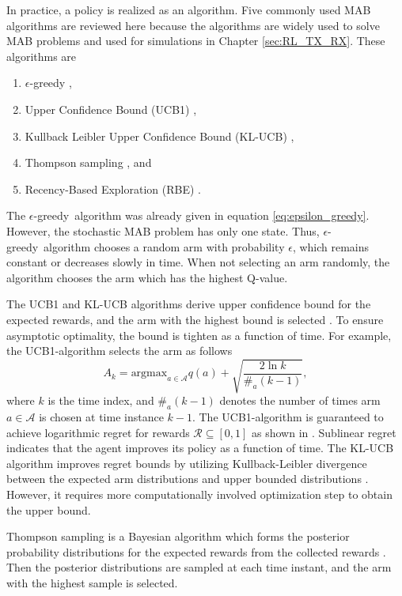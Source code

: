 \documentclass[english, 12pt, a4paper, elec, utf8, a-1b, online]{aaltothesis}
\newcommand{\As}{\mathcal{A}}
\newcommand{\Rs}{\mathcal{R}}
\newcommand{\argmax}{\text{argmax}}
\newcommand{\egreedy}{$\epsilon$-greedy~}
\begin{document}
In practice, a policy is realized as an algorithm.
Five commonly used MAB algorithms are reviewed here because the algorithms are widely used to solve MAB problems and used for simulations in Chapter \ref{sec:RL_TX_RX}.
These algorithms are
\begin{enumerate}
    \item $\epsilon$-greedy \cite{Sutton2018},
    \item Upper Confidence Bound (UCB1) \cite{Auer2002, Garivier2008},
    \item Kullback Leibler Upper Confidence Bound (KL-UCB) \cite{Garivier2011},
    \item Thompson sampling \cite{Agrawal2012, Raj2017}, and
    \item Recency-Based Exploration (RBE) \cite{Oksanen2015,Oksanen2017}.
\end{enumerate}
The \egreedy algorithm was already given in equation \eqref{eq:epsilon_greedy}.
However, the stochastic MAB problem has only one state.
Thus, \egreedy algorithm chooses a random arm with probability $\epsilon$, which remains constant or decreases slowly in time. 
When not selecting an arm randomly, the algorithm chooses the arm which has the highest Q-value.

The UCB1 and KL-UCB algorithms derive upper confidence bound for the expected rewards, and the arm with the highest bound is selected \cite{Auer2002, Garivier2011}.
To ensure asymptotic optimality, the bound is tighten as a function of time.
For example, the UCB1-algorithm selects the arm as follows \cite{Auer2002}
\begin{equation}
    A_k = \argmax_{a \in \As} q(a) + \sqrt{\frac{2 \ln{k}}{\#_a(k-1)}},
\end{equation}
where $k$ is the time index, and $\#_a(k-1)$ denotes the number of times arm $a \in \As$ is chosen at time instance $k-1$.
The UCB1-algorithm is guaranteed to achieve logarithmic regret for rewards $\Rs \subseteq [0, 1]$ as shown in \cite{Auer2002}.
Sublinear regret indicates that the agent improves its policy as a function of time.
The KL-UCB algorithm improves regret bounds by utilizing Kullback-Leibler divergence between the expected arm distributions and upper bounded distributions \cite{Garivier2011}.
However, it requires more computationally involved optimization step to obtain the upper bound.

Thompson sampling is a Bayesian algorithm which forms the posterior probability distributions for the expected rewards from the collected rewards \cite{Agrawal2012}.
Then the posterior distributions are sampled at each time instant, and the arm with the highest sample is selected.
\end{document}
